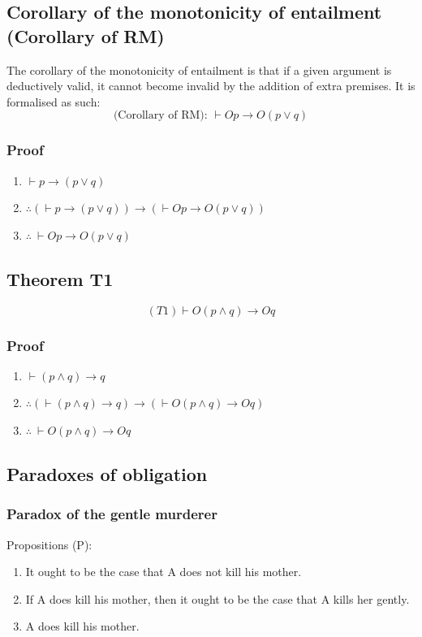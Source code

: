 \documentclass[11pt]{article}
\begin{document}
\subsection{Corollary of the monotonicity of entailment (Corollary of RM)}
\label{sec:orgc9efc37}
The corollary of the monotonicity of entailment is that if a given argument is deductively valid, it cannot become invalid by the addition of extra premises. It is formalised as such:
\[\text{(Corollary of RM): } \vdash Op \rightarrow O(p \vee q)\]
\subsubsection{Proof}
\label{sec:org3afcc0d}
\begin{enumerate}
\item \(\vdash p \rightarrow (p \vee q)\)
\item \(\therefore (\vdash p \rightarrow (p \vee q)) \rightarrow (\vdash Op \rightarrow O(p \vee q))\)
\item \(\therefore \ \vdash Op \rightarrow O(p \vee q)\)
\end{enumerate}
\subsection{Theorem T1}
\label{sec:orgc6fb14f}
\[(T1) \vdash O(p \wedge q) \rightarrow Oq\]
\subsubsection{Proof}
\label{sec:orge53d3f7}
\begin{enumerate}
\item \(\vdash (p \wedge q) \rightarrow q\)
\item \(\therefore (\vdash (p \wedge q) \rightarrow q) \rightarrow (\vdash O(p \wedge q) \rightarrow Oq)\)
\item \(\therefore \ \vdash O(p \wedge q) \rightarrow Oq\)
\end{enumerate}
\subsection{Paradoxes of obligation}
\label{sec:orgd9c16b4}

\subsubsection{Paradox of the gentle murderer}
\label{sec:org5c7048e}
Propositions (P):
\begin{enumerate}
\item It ought to be the case that A does not kill his mother.
\item If A does kill his mother, then it ought to be the case that A kills her gently.
\item A does kill his mother.
\end{enumerate}
\end{document}

